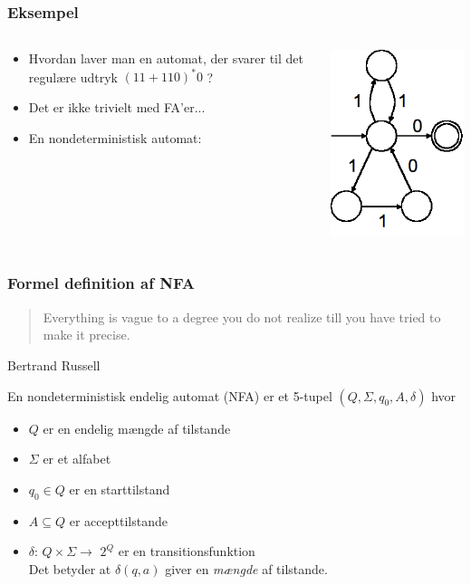 \begin{frame}
\frametitle{Eksempel}

\begin{columns}
  \begin{column}{9cm}
    \begin{itemize}[<+->]
    \item Hvordan laver man en automat, der svarer til det regulære
      udtryk $(11 + 110)^*0$ ?

    \item Det er ikke trivielt med FA’er...

    \item En nondeterministisk automat:
    \end{itemize}
  \end{column}
\pause
  \begin{column}{5cm}
      \includegraphics[scale=0.4]{images/2_seminar_nondet}
  \end{column}
\end{columns}
\end{frame}
\begin{frame}
\frametitle{Formel definition af NFA}
\begin{verse}
Everything is vague to a degree you do not realize till you have tried to make it precise.
\end{verse}
    Bertrand Russell
    
\pause
En nondeterministisk endelig automat (NFA) er et 5-tupel $(Q, \Sigma, q_0, A, \delta)$ hvor
 
\begin{itemize}[<+->]
\item $Q$ er en endelig mængde af tilstande
\item $\Sigma$ er et alfabet
\item $q_0\in Q$ er en starttilstand
\item $A\subseteq Q$ er accepttilstande
\item $\delta$: $Q\times \Sigma \rightarrow$ \alert{$2^Q$} er en transitionsfunktion\\
  Det betyder at $\delta(q,a)$ giver en \emph{mængde} af tilstande.
\end{itemize}
\end{frame}

